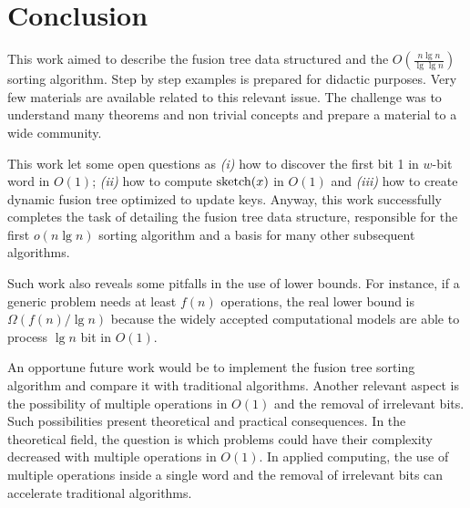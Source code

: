 \documentclass[11pt]{article}
\newcommand{\sk}[1]{\mbox{\rm{sketch}}(#1)}
\begin{document}
\section{Conclusion}
\label{cap:conclusao}

This work aimed to describe the fusion tree data structured and the $O(\frac{n\lg n}{\lg \lg n})$ sorting algorithm. Step by step examples is prepared for didactic purposes. Very few materials are available related to this relevant issue. The challenge was to understand many theorems and non trivial concepts and prepare a material to a wide community.

	This work let some open questions as \textit{(i)} how to discover the first bit 1 in $w$-bit word in $O(1)$; \textit{(ii)} how to compute $\sk{x}$ in $O(1)$ and \textit{(iii)} how to create dynamic fusion tree optimized to update keys. Anyway, this work successfully completes the task of detailing the fusion tree data structure, responsible for the first $o(n \lg n)$ sorting algorithm and a basis for many other subsequent algorithms.
	
Such work also reveals some pitfalls in the use of lower bounds. For instance, if a generic problem needs at least $f(n)$ operations, the real lower bound is $\Omega(f(n)/\lg n)$ because the widely accepted computational models are able to process $\lg n$ bit in $O(1)$.

An opportune future work would be to implement the fusion tree sorting algorithm and compare it with traditional algorithms. Another relevant aspect is the possibility of multiple operations in $O(1)$ and the removal of irrelevant bits. Such possibilities present theoretical and practical consequences. In the theoretical field, the question is which problems could have their complexity decreased with multiple operations in $O(1)$. In applied computing, the use of multiple operations inside a single word and the removal of irrelevant bits can accelerate traditional algorithms.








\end{document}

